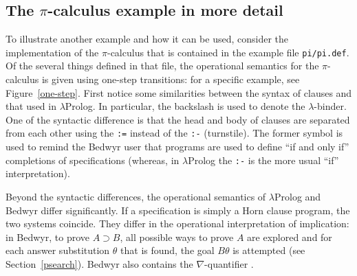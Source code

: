 \documentclass{article}
\providecommand{\texorpdfstring}[2]{#1}
\newcommand{\lp}{$\lambda$Prolog}
\begin{document}
\subsection{The \texorpdfstring{$\pi$}{pi}-calculus example in more detail}
\label{pi-examples}

To illustrate another example and how it
can be used, consider the implementation of the $\pi$-calculus that is
contained in the example file \verb+pi/pi.def+.  Of the several
things defined in that file, the operational semantics for the
$\pi$-calculus is given using one-step transitions: for a specific
example, see Figure~\ref{one-step}.  First notice some similarities
between the syntax of clauses and that used in \lp{}.  In
particular, the backslash is used to denote the $\lambda$-binder.  One
of the syntactic difference is that the head and body of clauses are
separated from each other using the \verb+:=+ instead of the
\verb+:-+ (turnstile).  The former symbol is used to remind
the Bedwyr user that programs are used to define ``if and only if''
completions of specifications (whereas, in \lp{} the \verb+:-+ is the
more usual ``if'' interpretation).

Beyond the syntactic differences, the operational semantics of \lp{}
and Bedwyr differ significantly.  If a specification is simply a Horn
clause program, the two systems coincide. They differ in the operational
interpretation of implication: in Bedwyr, to prove $A\supset B$, all
possible ways to prove $A$ are explored and
for each answer substitution $\theta$ that is found, the goal
$B\theta$ is attempted (see Section~\ref{psearch}).  Bedwyr also
contains the $\nabla$-quantifier \cite{miller05tocl}.
\end{document}
